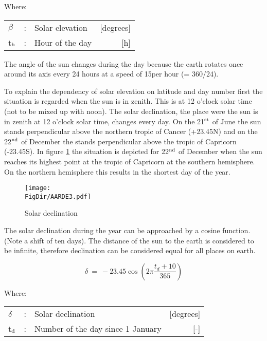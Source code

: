 Where:\\[5pt]
\begin{tabularx}{\textwidth}{llXr}
	$\beta$ &:& Solar elevation  & [degrees]\\
	t$_{{\rm h}}$ &:& Hour of the day  & [h]\\
\end{tabularx}

The angle of the sun changes during the day because the earth rotates once around its axis
every 24 hours at a speed of 15\degrees per hour (= 360/24).  

To explain the dependency of solar elevation on latitude and day number first the situation
is regarded when the sun is in zenith. This is at 12 o'clock solar time (not to be mixed up
with noon). The solar declination, the place were the sun is in zenith at 12 o'clock solar
time, changes every day. On the 21$^{\rm st}$ of June the sun stands perpen\-dicular above 
the northern tropic of Cancer (+23.45\degrees N) and on the 22$^{\rm nd}$ of December the 
stands perpendicular above the tropic of Capricorn (-23.45\degrees S). In figure 
\ref{fig:solardecl} the situation is depicted for 22$^{\rm nd}$ of December when the sun 
reaches its highest point at the tropic of Capricorn at the southern hemisphere. On the 
northern hemisphere this results in the shortest day of the year.

\begin{figure}[p]
	\centering
	\texttt{[image: \\FigDir/AARDE3.pdf]}
	\caption{Solar declination}
	\label{fig:solardecl}
\end{figure}

The solar declination during the year can be approached by a cosine function. (Note a shift of ten days).
The distance of the sun to the earth is considered to be infinite, therefore declination 
can be considered equal for all places on earth.

\begin{equation}
\delta ~=~ -23.45 \cos ( 2 \pi {\frac{t _{d} + 10}{365}} )
\end{equation}

Where:\\[5pt]
\begin{tabularx}{\textwidth}{llXr}
	$\delta$ &:& Solar declination   & [de\-grees]\\
	t$_{{\rm d}}$ &:& Number of the day since 1 January   & [-]\\
\end{tabularx}

